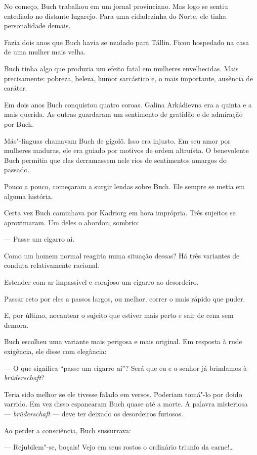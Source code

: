 No começo, Buch trabalhou em um jornal provinciano. Mas logo se sentiu
entediado no distante lugarejo. Para uma cidadezinha do Norte, ele tinha
personalidade demais.

Fazia dois anos que Buch havia se mudado para Tállin. Ficou hospedado na
casa de uma mulher mais velha.

Buch tinha algo que produzia um efeito fatal em mulheres envelhecidas.
Mais precisamente: pobreza, beleza, humor sarcástico e, o mais
importante, ausência de caráter.

Em dois anos Buch conquistou quatro coroas. Galina Arkádievna era a
quinta e a mais querida. As outras guardaram um sentimento de gratidão e
de admiração por Buch.

Más"-línguas chamavam Buch de gigolô. Isso era injusto. Em seu amor por
mulheres maduras, ele era guiado por motivos de ordem altruísta. O
benevolente Buch permitia que elas derramassem nele rios de sentimentos
amargos do passado.

Pouco a pouco, começaram a surgir lendas sobre Buch. Ele sempre se metia
em alguma história.

Certa vez Buch caminhava por Kadriorg em hora imprópria. Três sujeitos
se aproximaram. Um deles o abordou, sombrio:

--- Passe um cigarro aí.

Como um homem normal reagiria numa situação dessas? Há três variantes de
conduta relativamente racional.

Estender com ar impassível e corajoso um cigarro ao desordeiro.

Passar reto por eles a passos largos, ou melhor, correr o mais rápido
que puder.

E, por último, nocautear o sujeito que estiver mais perto e sair de cena
sem demora.

Buch escolheu uma variante mais perigosa e mais original. Em resposta à
rude exigência, ele disse com elegância:

--- O que significa ``passe um cigarro aí''? Será que eu e o senhor já
brindamos à \emph{brüderschaft}?

Teria sido melhor se ele tivesse falado em versos. Poderiam tomá"-lo por
doido varrido. Em vez disso espancaram Buch quase até a morte. A palavra
misteriosa --- \emph{brüderschaft} --- deve ter deixado os desordeiros
furiosos.

Ao perder a consciência, Buch sussurrava:

--- Rejubilem"-se, boçais! Vejo em seus rostos o ordinário triunfo da
carne!\ldots{}

